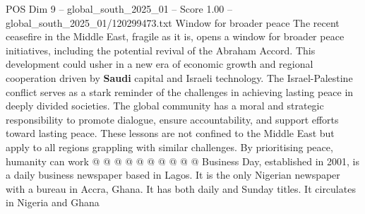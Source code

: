\begin{textsample}{POS Dim 9 – global\_south\_2025\_01 – Score 1.00 – global\_south\_2025\_01/120299473.txt}
Window for broader peace The recent ceasefire in the Middle East, fragile as it is, opens a window for broader peace initiatives, including the potential revival of the Abraham Accord.
This development could usher in a new era of economic growth and regional cooperation driven by \textbf{Saudi} capital and Israeli technology.
The Israel-Palestine conflict serves as a stark reminder of the challenges in achieving lasting peace in deeply divided societies.
The global community has a moral and strategic responsibility to promote dialogue, ensure accountability, and support efforts toward lasting peace.
These lessons are not confined to the Middle East but apply to all regions grappling with similar challenges.
By prioritising peace, humanity can work @ @ @ @ @ @ @ @ @ @ Business Day, established in 2001, is a daily business newspaper based in Lagos.
It is the only Nigerian newspaper with a bureau in Accra, Ghana.
It has both daily and Sunday titles.
It circulates in Nigeria and Ghana

\end{textsample}

